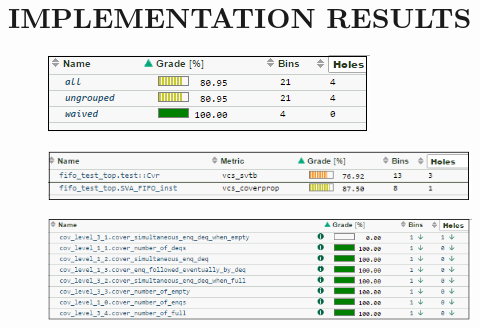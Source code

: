 \chapter{IMPLEMENTATION RESULTS}
\label{chap:results}
\vspace{15pt}
\begin{figure}[h!]
\centering
\includegraphics{./figures/coverage_db.png}
\caption{}
\label{fig:coverage_db.png}
\end{figure}

\vspace{15pt}
\begin{figure}[h!]
\centering
\includegraphics{./figures/coverage_db1.png}
\caption{}
\label{fig:coverage_db1.png}
\end{figure}

\vspace{15pt}
\begin{figure}[h!]
\centering
\includegraphics{./figures/coverage_db2.png}
\caption{}
\label{fig:coverage_db2.png}
\end{figure}
